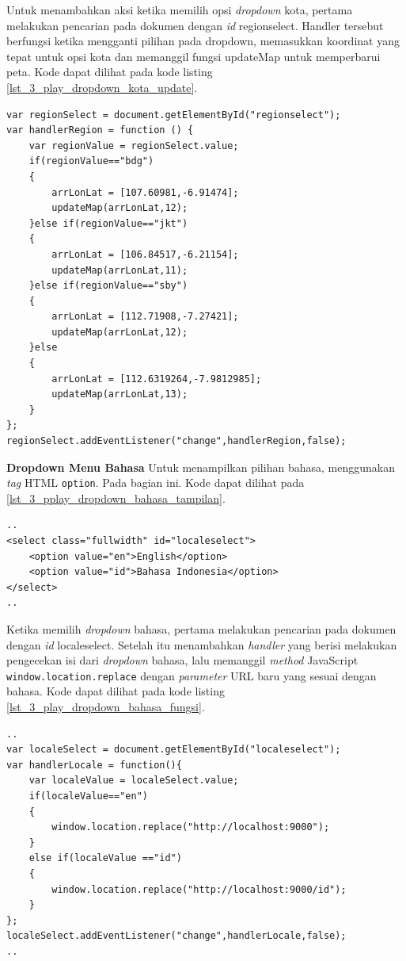\documentclass[a4paper,twoside]{article}
\begin{document}
\begin{enumerate}
Untuk menambahkan aksi ketika memilih opsi \textit{dropdown} kota, pertama melakukan pencarian pada dokumen dengan \textit{id} regionselect. Handler tersebut berfungsi ketika mengganti pilihan pada dropdown, memasukkan koordinat yang tepat untuk opsi kota dan memanggil fungsi updateMap untuk memperbarui peta. Kode dapat dilihat pada kode listing \ref{lst_3_play_dropdown_kota_update}.
\begin{lstlisting}[caption=Fungsi JavaScript untuk menambahkan \textit{handler} ketika mengganti \textit{dropdown} kota ,label = {lst_3_play_dropdown_kota_update}]
var regionSelect = document.getElementById("regionselect");
var handlerRegion = function () {
    var regionValue = regionSelect.value;
    if(regionValue=="bdg")
    {
        arrLonLat = [107.60981,-6.91474];
        updateMap(arrLonLat,12);
    }else if(regionValue=="jkt")
    {
        arrLonLat = [106.84517,-6.21154];
        updateMap(arrLonLat,11);
    }else if(regionValue=="sby")
    {
        arrLonLat = [112.71908,-7.27421];
        updateMap(arrLonLat,12);
    }else
    {
        arrLonLat = [112.6319264,-7.9812985];
        updateMap(arrLonLat,13);
    }
};
regionSelect.addEventListener("change",handlerRegion,false);
\end{lstlisting}

\textbf{Dropdown Menu Bahasa}
Untuk menampilkan pilihan bahasa, menggunakan \textit{tag} HTML \verb!option!. Pada bagian ini. Kode dapat dilihat pada \ref{lst_3_pplay_dropdown_bahasa_tampilan}.

\begin{lstlisting}[caption=Menampilkan pilihan bahasa kepada pengguna ,label = {lst_3_play_dropdown_bahasa_tampilan}]
..
<select class="fullwidth" id="localeselect">
    <option value="en">English</option>
    <option value="id">Bahasa Indonesia</option>
</select>
..
\end{lstlisting}

Ketika memilih \textit{dropdown} bahasa, pertama melakukan pencarian pada dokumen dengan \textit{id} localeselect. Setelah itu menambahkan \textit{handler} yang berisi melakukan pengecekan isi dari \textit{dropdown} bahasa, lalu memanggil \textit{method} JavaScript \verb!window.location.replace! dengan \textit{parameter} URL baru yang sesuai dengan bahasa. Kode dapat dilihat pada kode listing \ref{lst_3_play_dropdown_bahasa_fungsi}.
\begin{lstlisting}[caption=Fungsi JavaScript untuk Internationalization ,label = {lst_3_play_dropdown_bahasa_fungsi}]
..
var localeSelect = document.getElementById("localeselect");
var handlerLocale = function(){
    var localeValue = localeSelect.value;
    if(localeValue=="en")
    {
        window.location.replace("http://localhost:9000");
    }
    else if(localeValue =="id")
    {
        window.location.replace("http://localhost:9000/id");
    }
};
localeSelect.addEventListener("change",handlerLocale,false);
..
\end{lstlisting}


\end{enumerate}
\end{document}
